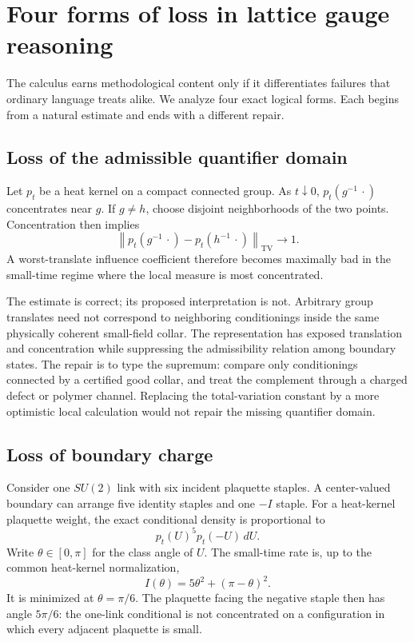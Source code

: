 \section{Four forms of loss in lattice gauge reasoning}
\label{sec:failures}

The calculus earns methodological content only if it differentiates failures
that ordinary language treats alike.  We analyze four exact logical forms.
Each begins from a natural estimate and ends with a different repair.

\subsection{Loss of the admissible quantifier domain}

Let $p_t$ be a heat kernel on a compact connected group.  As $t\downarrow0$,
$p_t(g^{-1}\,\cdot)$ concentrates near $g$.  If $g\neq h$, choose disjoint
neighborhoods of the two points.  Concentration then implies
\begin{equation}
\label{eq:tv-translate}
 \left\|p_t(g^{-1}\,\cdot)-p_t(h^{-1}\,\cdot)\right\|_{\mathrm{TV}}
 \longrightarrow 1.
\end{equation}
A worst-translate influence coefficient therefore becomes maximally bad in
the small-time regime where the local measure is most concentrated.

The estimate is correct; its proposed interpretation is not.  Arbitrary
group translates need not correspond to neighboring conditionings inside the
same physically coherent small-field collar.  The representation has exposed
translation and concentration while suppressing the admissibility relation
among boundary states.  The repair is to type the supremum: compare only
conditionings connected by a certified good collar, and treat the complement
through a charged defect or polymer channel.  Replacing the total-variation
constant by a more optimistic local calculation would not repair the missing
quantifier domain.

\subsection{Loss of boundary charge}

Consider one $SU(2)$ link with six incident plaquette staples.  A center-valued
boundary can arrange five identity staples and one $-I$ staple.  For a
heat-kernel plaquette weight, the exact conditional density is proportional
to
\begin{equation}
\label{eq:frustrated-density}
 p_t(U)^5p_t(-U)\,dU.
\end{equation}
Write $\theta\in[0,\pi]$ for the class angle of $U$.  The small-time rate is,
up to the common heat-kernel normalization,
\[
 I(\theta)=5\theta^2+(\pi-\theta)^2.
\]
It is minimized at $\theta=\pi/6$.  The plaquette facing the negative staple
then has angle $5\pi/6$: the one-link conditional is not concentrated on a
configuration in which every adjacent plaquette is small.

